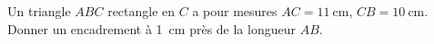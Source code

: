 
\begin{exercice}\label{exosmath-0843}

    Un triangle \( ABC\) rectangle en \( C\) a pour mesures \( AC=\SI{11}{\centi\meter}\), \( CB=\SI{10}{\centi\meter}\). Donner un encadrement à \SI{1}{\centi\meter} près de la longueur \( AB\).

\end{exercice}
